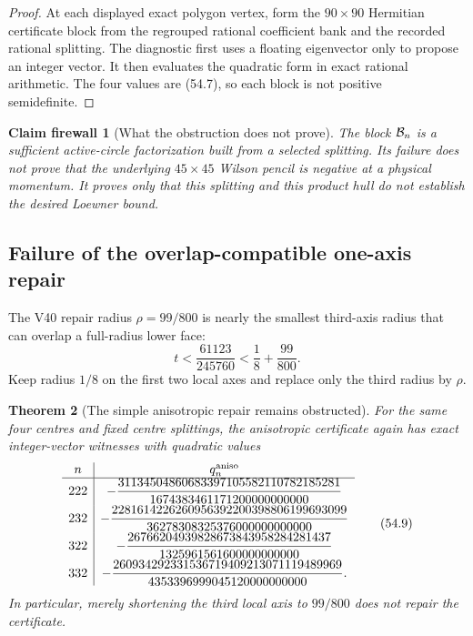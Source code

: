 \documentclass[11pt,oneside]{article}
\newtheorem{theorem}{Theorem}[section]
\newtheorem{firewall}[theorem]{Claim firewall}
\theoremstyle{definition}
\theoremstyle{remark}
\begin{document}
\begin{proof}
At each displayed exact polygon vertex, form the \(90\times90\)
Hermitian certificate block from the regrouped rational
coefficient bank and the recorded rational splitting.  The
diagnostic first uses a floating eigenvector only to propose an
integer vector.  It then evaluates the quadratic form in exact
rational arithmetic.  The four values are (54.7), so each block is
not positive semidefinite.
\end{proof}

\begin{firewall}[What the obstruction does not prove]
\label{fire:newv54-certificate-only}
The block \({\cal B}_n\) is a sufficient active-circle
factorization built from a selected splitting.  Its failure does
not prove that the underlying \(45\times45\) Wilson pencil is
negative at a physical momentum.  It proves only that this
splitting and this product hull do not establish the desired
Loewner bound.
\end{firewall}

\subsection{Failure of the overlap-compatible one-axis repair}

The V40 repair radius \(\rho=99/800\) is nearly the smallest
third-axis radius that can overlap a full-radius lower face:
\[
 t<\frac{61123}{245760}
   <\frac18+\frac{99}{800}.                            \tag{54.8}
\]
Keep radius \(1/8\) on the first two local axes and replace only
the third radius by \(\rho\).

\begin{theorem}[The simple anisotropic repair remains obstructed]
\label{thm:newv54-anisotropic-obstructions}
For the same four centres and fixed centre splittings, the
anisotropic certificate again has exact integer-vector witnesses
with quadratic values
\[
\begin{array}{c|c}
n&q_n^{\rm aniso}\\ \hline
222&-\dfrac{31134504860683397105582110782185281}
{1674383461171200000000000}\\[5pt]
232&-\dfrac{2281614226260956392200398806199693099}
{36278308325376000000000000}\\[5pt]
322&-\dfrac{26766204939828673843958284281437}
{1325961561600000000000}\\[5pt]
332&-\dfrac{260934292331536719409213071119489969}
{4353396999045120000000000}.
\end{array}                                             \tag{54.9}
\]
In particular, merely shortening the third local axis to
\(99/800\) does not repair the certificate.
\end{theorem}
\end{document}
